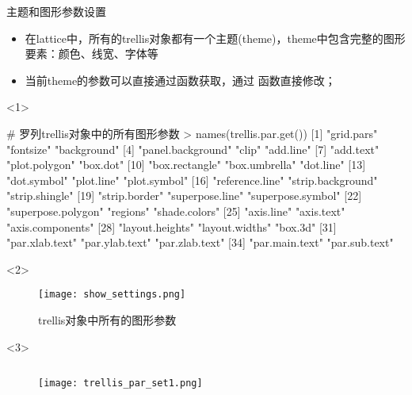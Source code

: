 \begin{frame}[t,fragile]{\subsecname}{主题和图形参数设置}
\begin{itemize}
\item 在lattice中，所有的trellis对象都有一个主题(theme)，theme中包含完整的图形要素：颜色、线宽、字体等
\item 当前theme的参数可以直接通过函数获取，通过
函数直接修改；
\end{itemize}

\begin{overlayarea}{\textwidth}{\textheight}
\begin{onlyenv}<1>
\begin{rcode}
# 罗列trellis对象中的所有图形参数
> names(trellis.par.get())
 [1] "grid.pars"         "fontsize"          "background"       
 [4] "panel.background"  "clip"              "add.line"         
 [7] "add.text"          "plot.polygon"      "box.dot"          
[10] "box.rectangle"     "box.umbrella"      "dot.line"         
[13] "dot.symbol"        "plot.line"         "plot.symbol"      
[16] "reference.line"    "strip.background"  "strip.shingle"    
[19] "strip.border"      "superpose.line"    "superpose.symbol" 
[22] "superpose.polygon" "regions"           "shade.colors"     
[25] "axis.line"         "axis.text"         "axis.components"  
[28] "layout.heights"    "layout.widths"     "box.3d"           
[31] "par.xlab.text"     "par.ylab.text"     "par.zlab.text"    
[34] "par.main.text"     "par.sub.text"    
\end{rcode}
\end{onlyenv}

\vspace{-10pt}
\begin{onlyenv}<2>
\begin{figure}[ht]
  \centering
  \texttt{[image: show\_settings.png]}
  \caption{trellis对象中所有的图形参数}
\end{figure}
\end{onlyenv}

\begin{onlyenv}<3>
\begin{figure}
 \begin{columns}
    \begin{column}[c]{.4\textwidth}
        \texttt{[image: trellis\_par\_set1.png]}
    \end{column}


\end{columns}
\end{figure}
\end{onlyenv}
\end{overlayarea}
\end{frame}

